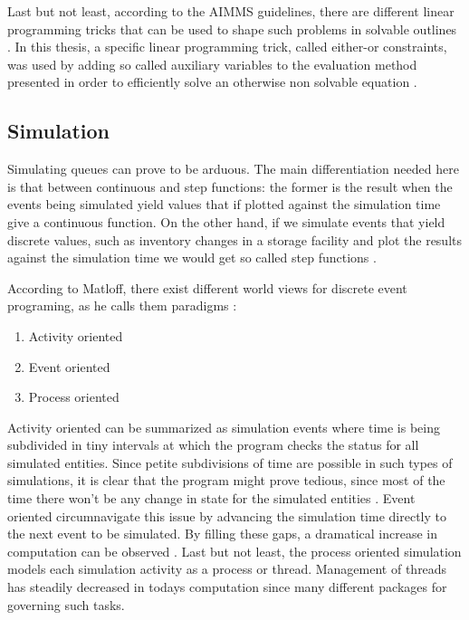 \documentclass{seal_thesis}
\begin{document}
Last but not least, according to the AIMMS guidelines, there are different linear programming tricks that can be used to shape such problems in solvable outlines \cite{Bisschop2016}. In this thesis, a specific linear programming trick, called either-or constraints, was used by adding so called auxiliary variables to the evaluation method presented in order to efficiently solve an otherwise non solvable equation \cite[p. 77]{Bisschop2016}.

\subsection{Simulation}

Simulating queues can prove to be arduous. The main differentiation needed here is that between continuous and step functions: the former is the result when the events being simulated yield values that if plotted against the simulation time give a continuous function. On the other hand, if we simulate events that yield discrete values, such as inventory changes in a storage facility and plot the results against the simulation time we would get so called step functions \cite{Matloff2008}.

According to Matloff, there exist different world views for discrete event programing, as he calls them paradigms \cite{Matloff2008}:

\begin{enumerate}
	\item Activity oriented
	\item Event oriented
	\item Process oriented
\end{enumerate}

Activity oriented can be summarized as simulation events where time is being subdivided in tiny intervals at which the program checks the status for all simulated entities. Since petite subdivisions of time are possible in such types of simulations, it is clear that the program might prove tedious, since most of the time there won't be any change in state for the simulated entities \cite{Matloff2008}. Event oriented circumnavigate this issue by advancing the simulation time directly to the next event to be simulated. By filling these gaps, a dramatical increase in computation can be observed \cite{Matloff2008}. Last but not least, the process oriented simulation models each simulation activity as a process or thread. Management of threads has steadily decreased in todays computation since many different packages for governing such tasks.
\end{document}
